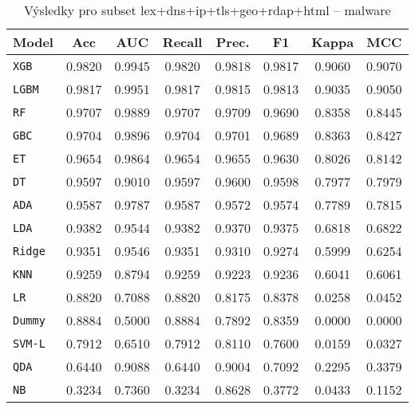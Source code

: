 \begin{table}[H]
  \centering
  \small
  \caption{Výsledky pro subset lex+dns+ip+tls+geo+rdap+html – malware}
  \begin{tabular}{|l|c|c|c|c|c|c|c|}
    \hline
    \textbf{Model} & \textbf{Acc} & \textbf{AUC} & \textbf{Recall} & \textbf{Prec.} & \textbf{F1} & \textbf{Kappa} & \textbf{MCC} \\
    \hline
    \texttt{XGB} & 0.9820 & 0.9945 & 0.9820 & 0.9818 & 0.9817 & 0.9060 & 0.9070 \\
    \texttt{LGBM} & 0.9817 & 0.9951 & 0.9817 & 0.9815 & 0.9813 & 0.9035 & 0.9050 \\
    \texttt{RF} & 0.9707 & 0.9889 & 0.9707 & 0.9709 & 0.9690 & 0.8358 & 0.8445 \\
    \texttt{GBC} & 0.9704 & 0.9896 & 0.9704 & 0.9701 & 0.9689 & 0.8363 & 0.8427 \\
    \texttt{ET} & 0.9654 & 0.9864 & 0.9654 & 0.9655 & 0.9630 & 0.8026 & 0.8142 \\
    \texttt{DT} & 0.9597 & 0.9010 & 0.9597 & 0.9600 & 0.9598 & 0.7977 & 0.7979 \\
    \texttt{ADA} & 0.9587 & 0.9787 & 0.9587 & 0.9572 & 0.9574 & 0.7789 & 0.7815 \\
    \texttt{LDA} & 0.9382 & 0.9544 & 0.9382 & 0.9370 & 0.9375 & 0.6818 & 0.6822 \\
    \texttt{Ridge} & 0.9351 & 0.9546 & 0.9351 & 0.9310 & 0.9274 & 0.5999 & 0.6254 \\
    \texttt{KNN} & 0.9259 & 0.8794 & 0.9259 & 0.9223 & 0.9236 & 0.6041 & 0.6061 \\
    \texttt{LR} & 0.8820 & 0.7088 & 0.8820 & 0.8175 & 0.8378 & 0.0258 & 0.0452 \\
    \texttt{Dummy} & 0.8884 & 0.5000 & 0.8884 & 0.7892 & 0.8359 & 0.0000 & 0.0000 \\
    \texttt{SVM-L} & 0.7912 & 0.6510 & 0.7912 & 0.8110 & 0.7600 & 0.0159 & 0.0327 \\
    \texttt{QDA} & 0.6440 & 0.9088 & 0.6440 & 0.9004 & 0.7092 & 0.2295 & 0.3379 \\
    \texttt{NB} & 0.3234 & 0.7360 & 0.3234 & 0.8628 & 0.3772 & 0.0433 & 0.1152 \\
    \hline
  \end{tabular}
\end{table}
\vspace{0.5cm}


